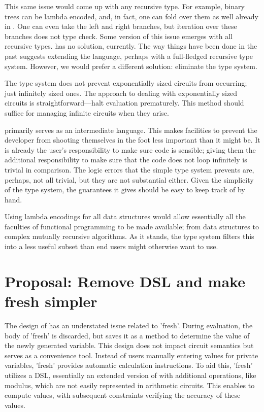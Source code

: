 \documentclass[
    9pt,            
    techreport,       
    affiltop,       
]{art}
\begin{document}
This same issue would come up with any recursive type. For example, binary trees can be lambda encoded, and, in fact, one can fold over them as well already in \VampIR{}. One can even take the left and right branches, but iteration over these branches does not type check. Some version of this issue emerges with all recursive types. \VampIR{} has no solution, currently. The way things have been done in the past suggests extending the language, perhaps with a full-fledged recursive type system. However, we would prefer a different solution: eliminate the type system.

\begin{remark}
The type system does not prevent exponentially sized circuits from occurring; just infinitely sized ones. The approach to dealing with exponentially sized circuits is straightforward—halt evaluation prematurely. This method should suffice for managing infinite circuits when they arise.
\end{remark}

\VampIR{} primarily serves as an intermediate language. This makes facilities to prevent the developer from shooting themselves in the foot less important than it might be. It is already the user's responsibility to make sure \VampIR{} code is sensible; giving them the additional responsibility to make sure that the code does not loop infinitely is trivial in comparison. The logic errors that the simple type system prevents are, perhaps, not all trivial, but they are not substantial either. Given the simplicity of the type system, the guarantees it gives should be easy to keep track of by hand.

Using lambda encodings for all data structures would allow essentially all the faculties of functional programming to be made available; from data structures to complex mutually recursive algorithms. As it stands, the type system filters this into a less useful subset than end users might otherwise want to use.

\section{Proposal: Remove DSL and make fresh simpler}\label{sec:removal-dsl}

The design of \VampIR{} has an understated issue related to 'fresh'. During evaluation, the body of 'fresh' is discarded, but \VampIR{} saves it as a method to determine the value of the newly generated variable. This design does not impact circuit semantics but serves as a convenience tool. Instead of users manually entering values for private variables, 'fresh' provides automatic calculation instructions. To aid this, 'fresh' utilizes a DSL, essentially an extended version of \VampIR{} with additional operations, like modulus, which are not easily represented in arithmetic circuits. This enables  to compute values, with subsequent constraints verifying the accuracy of these values.
\end{document}

